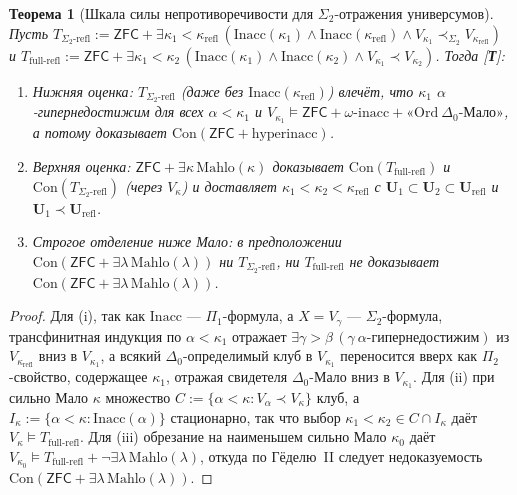 \documentclass[11pt]{article}
\theoremstyle{plain}
\newtheorem{theorem}{Теорема}[section]
\theoremstyle{definition}
\newcommand{\Con}{\mathrm{Con}}
\newcommand{\ZFC}{\mathsf{ZFC}}
\begin{document}
\begin{theorem}[Шкала силы непротиворечивости для $\Sigma_2$-отражения универсумов]\label{thm:b2-sigma2-bracket}
Пусть $T_{\Sigma_2\text{-}\mathrm{refl}} := \ZFC + \exists \kappa_1 < \kappa_{\mathrm{refl}}\,(\mathrm{Inacc}(\kappa_1) \wedge \mathrm{Inacc}(\kappa_{\mathrm{refl}}) \wedge V_{\kappa_1} \prec_{\Sigma_2} V_{\kappa_{\mathrm{refl}}})$ и $T_{\mathrm{full}\text{-}\mathrm{refl}} := \ZFC + \exists \kappa_1 < \kappa_2\,(\mathrm{Inacc}(\kappa_1) \wedge \mathrm{Inacc}(\kappa_2) \wedge V_{\kappa_1} \prec V_{\kappa_2})$. Тогда \textup{[\textbf{Т}]}:
\begin{enumerate}[nosep,label=(\roman*)]
\item \emph{Нижняя оценка}: $T_{\Sigma_2\text{-}\mathrm{refl}}$ (даже без $\mathrm{Inacc}(\kappa_{\mathrm{refl}})$) влечёт, что $\kappa_1$ $\alpha$-гипернедостижим для всех $\alpha < \kappa_1$ и $V_{\kappa_1} \models \ZFC + \omega\text{-}\mathrm{inacc} + \text{«}\mathrm{Ord}\ \Delta_0\text{-Мало»}$, а потому доказывает $\Con(\ZFC + \text{hyperinacc})$.
\item \emph{Верхняя оценка}: $\ZFC + \exists \kappa\,\mathrm{Mahlo}(\kappa)$ доказывает $\Con(T_{\mathrm{full}\text{-}\mathrm{refl}})$ и $\Con(T_{\Sigma_2\text{-}\mathrm{refl}})$ (через $V_\kappa$) и доставляет $\kappa_1 < \kappa_2 < \kappa_{\mathrm{refl}}$ с $\mathbf{U}_1 \subset \mathbf{U}_2 \subset \mathbf{U}_{\mathrm{refl}}$ и $\mathbf{U}_1 \prec \mathbf{U}_{\mathrm{refl}}$.
\item \emph{Строгое отделение ниже Мало}: в предположении $\Con(\ZFC + \exists \lambda\,\mathrm{Mahlo}(\lambda))$ ни $T_{\Sigma_2\text{-}\mathrm{refl}}$, ни $T_{\mathrm{full}\text{-}\mathrm{refl}}$ не доказывает $\Con(\ZFC + \exists \lambda\,\mathrm{Mahlo}(\lambda))$.
\end{enumerate}
\end{theorem}
\begin{proof}
Для (i), так как $\mathrm{Inacc}$ — $\Pi_1$-формула, а $X = V_\gamma$ — $\Sigma_2$-формула, трансфинитная индукция по $\alpha < \kappa_1$ отражает $\exists \gamma > \beta\,(\gamma\ \alpha\text{-гипернедостижим})$ из $V_{\kappa_{\mathrm{refl}}}$ вниз в $V_{\kappa_1}$, а всякий $\Delta_0$-определимый клуб в $V_{\kappa_1}$ переносится вверх как $\Pi_2$-свойство, содержащее $\kappa_1$, отражая свидетеля $\Delta_0$-Мало вниз в $V_{\kappa_1}$. Для (ii) при сильно Мало $\kappa$ множество $C := \{\alpha < \kappa : V_\alpha \prec V_\kappa\}$ клуб, а $I_\kappa := \{\alpha < \kappa : \mathrm{Inacc}(\alpha)\}$ стационарно, так что выбор $\kappa_1 < \kappa_2 \in C \cap I_\kappa$ даёт $V_\kappa \models T_{\mathrm{full}\text{-}\mathrm{refl}}$. Для (iii) обрезание на наименьшем сильно Мало $\kappa_0$ даёт $V_{\kappa_0} \models T_{\mathrm{full}\text{-}\mathrm{refl}} + \neg\exists\lambda\,\mathrm{Mahlo}(\lambda)$, откуда по Гёделю~II следует недоказуемость $\Con(\ZFC + \exists\lambda\,\mathrm{Mahlo}(\lambda))$.
\end{proof}
\end{document}
